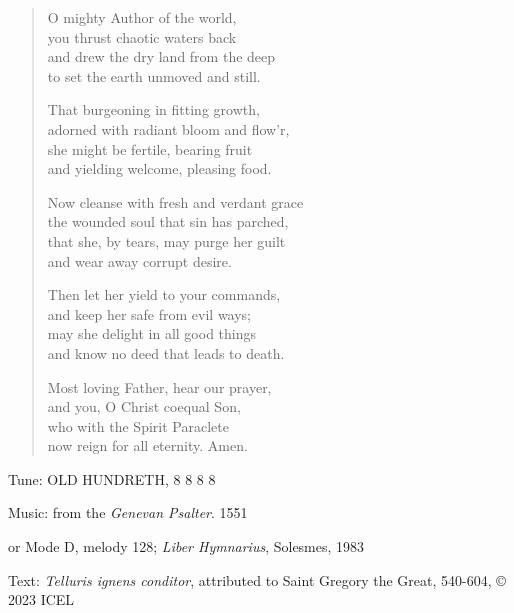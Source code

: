 \hymn

\begin{verse}
O mighty Author of the world,\\
you thrust chaotic waters back\\
and drew the dry land from the deep\\
to set the earth unmoved and still.

That burgeoning in fitting growth,\\
adorned with radiant bloom and flow’r,\\
she might be fertile, bearing fruit\\
and yielding welcome, pleasing food.

Now cleanse with fresh and verdant grace\\
the wounded soul that sin has parched,\\
that she, by tears, may purge her guilt\\
and wear away corrupt desire.

Then let her yield to your commands,\\
and keep her safe from evil ways;\\
may she delight in all good things\\
and know no deed that leads to death.

Most loving Father, hear our prayer,\\
and you, O Christ coequal Son,\\
who with the Spirit Paraclete\\
now reign for all eternity. Amen.
\end{verse}

\begin{hymnsource}
Tune: OLD HUNDRETH, 8 8 8 8

Music: from the \emph{Genevan Psalter}. 1551

or Mode D, melody 128; \emph{Liber Hymnarius}, Solesmes, 1983

Text: \emph{Telluris ignens conditor}, attributed to Saint Gregory the Great, 540-604, © 2023 ICEL
\end{hymnsource}